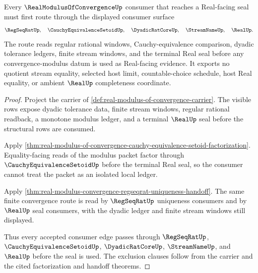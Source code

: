 \begin{theorem}
\label{thm:real-modulus-of-convergence-regseqrat-consumer-route}
Every $\RealModulusOfConvergenceUp$ consumer that reaches a Real-facing seal must first route through the displayed consumer surface
$$
\RegSeqRatUp,\quad \CauchyEquivalenceSetoidUp,\quad \DyadicRatCoreUp,\quad \StreamNameUp,\quad \RealUp .
$$
The route reads regular rational windows, Cauchy-equivalence comparison, dyadic tolerance ledgers, finite stream windows, and the terminal Real seal before any convergence-modulus datum is used as Real-facing evidence. It exports no quotient stream equality, selected host limit, countable-choice schedule, host Real equality, or ambient $\RealUp$ completeness coordinate.
\end{theorem}
\begin{proof}
Project the carrier of \autoref{def:real-modulus-of-convergence-carrier}. The visible rows expose dyadic tolerance data, finite stream windows, regular rational readback, a monotone modulus ledger, and a terminal $\RealUp$ seal before the structural rows are consumed.

Apply \autoref{thm:real-modulus-of-convergence-cauchy-equivalence-setoid-factorization}. Equality-facing reads of the modulus packet factor through $\CauchyEquivalenceSetoidUp$ before the terminal Real seal, so the consumer cannot treat the packet as an isolated local ledger.

Apply \autoref{thm:real-modulus-convergence-regseqrat-uniqueness-handoff}. The same finite convergence route is read by $\RegSeqRatUp$ uniqueness consumers and by $\RealUp$ seal consumers, with the dyadic ledger and finite stream windows still displayed.

Thus every accepted consumer edge passes through $\RegSeqRatUp$, $\CauchyEquivalenceSetoidUp$, $\DyadicRatCoreUp$, $\StreamNameUp$, and $\RealUp$ before the seal is used. The exclusion clauses follow from the carrier and the cited factorization and handoff theorems.
\end{proof}

